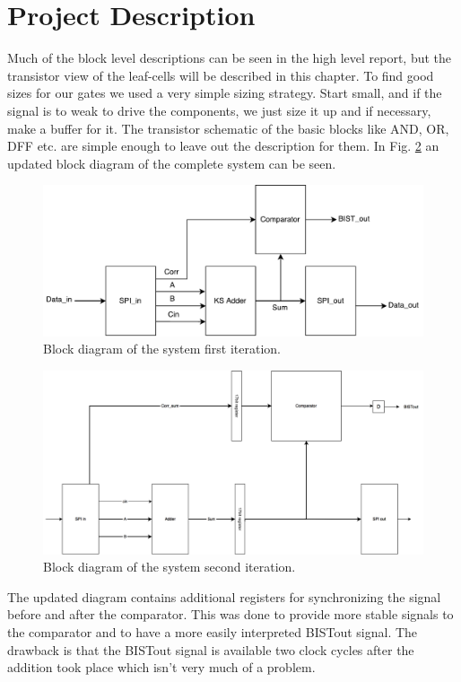 \section{Project Description} \label{sec:project_description}
Much of the block level descriptions can be seen in the high level report, but the transistor view of the leaf-cells will be described in this chapter. To find good sizes for our gates we used a very simple sizing strategy. Start small, and if the signal is to weak to drive the components, we just size it up and if necessary, make a buffer for it. The transistor schematic of the basic blocks like AND, OR, DFF etc. are simple enough to leave out the description for them. In Fig. \ref{block_second} an updated block diagram of the complete system can be seen.

\begin{figure}[H]
  \centering
  \captionsetup{justification=centering}
  \includegraphics[scale=0.5]{../figures/TOP.pdf}
  \caption{Block diagram of the system first iteration.} \label{fig:block_first}
\end{figure}

\begin{figure}[H]
\centering
\captionsetup{justification=centering}
\includegraphics[scale=0.175]{../figures/top_level.png}
\caption{Block diagram of the system second iteration.}
\label{block_second}
\end{figure}


\noindent The updated diagram contains additional registers for synchronizing the signal before and after the comparator. This was done to provide more stable signals to the comparator and to have a more easily interpreted BISTout signal. The drawback is that the BISTout signal is available two clock cycles after the addition took place which isn't very much of a problem.
